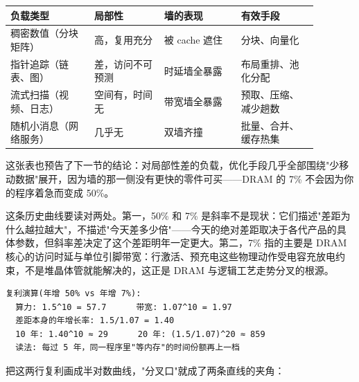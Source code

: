 \begin{longtable}{L{0.24\linewidth}L{0.20\linewidth}L{0.22\linewidth}L{0.22\linewidth}}
\toprule
负载类型 & 局部性 & 墙的表现 & 有效手段 \\
\midrule
稠密数值（分块矩阵） & 高，复用充分 & 被 cache 遮住 & 分块、向量化 \\
指针追踪（链表、图） & 差，访问不可预测 & 时延墙全暴露 & 布局重排、池化分配 \\
流式扫描（视频、日志） & 空间有，时间无 & 带宽墙全暴露 & 预取、压缩、减少趟数 \\
随机小消息（网络服务） & 几乎无 & 双墙齐撞 & 批量、合并、缓存热集 \\
\bottomrule
\end{longtable}

这张表也预告了下一节的结论：对局部性差的负载，优化手段几乎全部围绕"少移动数据"展开，因为墙的那一侧没有更快的零件可买——DRAM 的 7\% 不会因为你的程序着急而变成 50\%。

这条历史曲线要读对两处。第一，50\% 和 7\% 是斜率不是现状：它们描述"差距为什么越拉越大"，不描述"今天差多少倍"——今天的绝对差距取决于各代产品的具体参数，但斜率差决定了这个差距明年一定更大。第二，7\% 指的主要是 DRAM 核心的访问时延与单位引脚带宽：行激活、预充电这些物理动作受电容充放电约束，不是堆晶体管就能解决的，这正是 DRAM 与逻辑工艺走势分叉的根源。

\begin{lstlisting}
复利演算(年增 50% vs 年增 7%):
  算力: 1.5^10 = 57.7      带宽: 1.07^10 = 1.97
  差距本身的年增长率: 1.5/1.07 = 1.40
  10 年: 1.40^10 ≈ 29      20 年: (1.5/1.07)^20 ≈ 859
  读法: 每过 5 年，同一程序里"等内存"的时间份额再上一档
\end{lstlisting}

把这两行复利画成半对数曲线，"分叉口"就成了两条直线的夹角：

